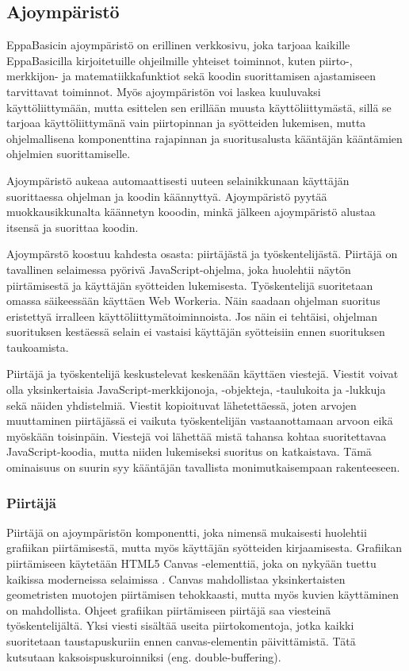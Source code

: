 \subsection{Ajoympäristö}
EppaBasicin ajoympäristö on erillinen verkkosivu,
joka tarjoaa kaikille EppaBasicilla kirjoitetuille
ohjeilmille yhteiset toiminnot, kuten piirto-,
merkkijon- ja matematiikkafunktiot sekä
koodin suorittamisen ajastamiseen tarvittavat toiminnot.
Myös ajoympäristön voi laskea kuuluvaksi käyttöliittymään,
mutta esittelen sen erillään muusta käyttöliittymästä,
sillä se tarjoaa käyttöliittymänä vain piirtopinnan
ja syötteiden lukemisen, mutta ohjelmallisena
komponenttina rajapinnan ja suoritusalusta kääntäjän
kääntämien ohjelmien suorittamiselle.

Ajoympäristö aukeaa automaattisesti uuteen selainikkunaan
käyttäjän suorittaessa ohjelman ja koodin käännyttyä.
Ajoympäristö pyytää muokkausikkunalta käännetyn kooodin,
minkä jälkeen ajoympäristö alustaa itsensä ja suorittaa koodin.

Ajoympärstö koostuu kahdesta osasta:
piirtäjästä ja työskentelijästä.
Piirtäjä on tavallinen selaimessa pyörivä
JavaScript-ohjelma, joka huolehtii
näytön piirtämisestä ja käyttäjän syötteiden lukemisesta.
Työskentelijä suoritetaan omassa säikeessään
käyttäen Web Workeria.
Näin saadaan ohjelman suoritus eristettyä
irralleen käyttöliittymätoiminnoista.
Jos näin ei tehtäisi, ohjelman suorituksen
kestäessä selain ei vastaisi käyttäjän
syötteisiin ennen suorituksen taukoamista.

Piirtäjä ja työskentelijä keskustelevat
keskenään käyttäen viestejä.
Viestit voivat olla yksinkertaisia
JavaScript-merkkijonoja,
-objekteja, -taulukoita ja -lukkuja
sekä näiden yhdistelmiä.
Viestit kopioituvat lähetettäessä,
joten arvojen muuttaminen piirtäjässä
ei vaikuta työskentelijän vastaanottamaan
arvoon eikä myöskään toisinpäin.
Viestejä voi lähettää mistä tahansa kohtaa
suoritettavaa JavaScript-koodia,
mutta niiden lukemiseksi suoritus on katkaistava.
Tämä ominaisuus on suurin syy kääntäjän
tavallista monimutkaisempaan rakenteeseen.

\subsubsection{Piirtäjä}
Piirtäjä on ajoympäristön komponentti,
joka nimensä mukaisesti huolehtii
grafiikan piirtämisestä,
mutta myös käyttäjän syötteiden kirjaamisesta.
Grafiikan piirtämiseen käytetään
HTML5 Canvas -elementtiä,
joka on nykyään tuettu kaikissa moderneissa
selaimissa \cite{caniuse_canvas}.
Canvas mahdollistaa yksinkertaisten
geometristen muotojen piirtämisen tehokkaasti,
mutta myös kuvien käyttäminen on mahdollista.
Ohjeet grafiikan piirtämiseen piirtäjä
saa viesteinä työskentelijältä.
Yksi viesti sisältää useita piirtokomentoja,
jotka kaikki suoritetaan taustapuskuriin ennen
canvas-elementin päivittämistä.
Tätä kutsutaan kaksoispuskuroinniksi
(eng. double-buffering).

